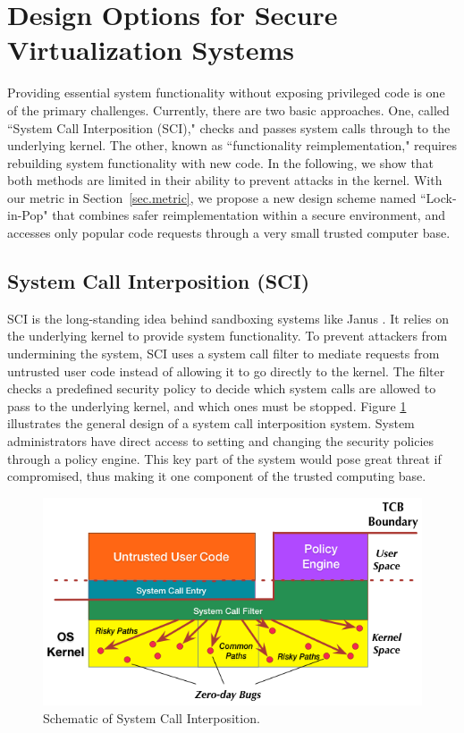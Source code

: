 \section{Design Options for Secure Virtualization Systems}
\label{sec.design}

Providing essential system functionality without exposing privileged code is one of the
primary challenges. 
Currently, there are two basic approaches.
One, called ``System Call Interposition (SCI)," checks and passes system calls
through to the underlying kernel. The other, known as ``functionality
reimplementation,"  
requires rebuilding system functionality with new code. In the
following, we show that both methods are limited in their ability to
prevent attacks in the kernel. 
With our metric in Section~\ref{sec.metric}, 
we propose a new design scheme named ``Lock-in-Pop" that combines safer reimplementation
within a secure environment, and accesses only popular code requests through a
very small trusted computer base. 


\subsection{System Call Interposition (SCI)}
SCI is the long-standing idea behind sandboxing systems like Janus
\cite{Janus0:96, Janus:99}. It relies on the underlying kernel
to provide system functionality. To prevent attackers from undermining the system,
SCI uses a system call filter to mediate requests
from untrusted user code instead of allowing it to go directly to the kernel.
The filter checks a predefined security policy to decide which system calls are
allowed to pass to the underlying kernel, and which ones must be stopped.
Figure \ref{fig:design_system_call_interposition} illustrates the general design
of a system call interposition system. System administrators have direct access to 
setting and changing the security policies through a policy engine. 
This key part of the system would pose great threat if compromised, thus making it 
one component of the trusted computing base. 

\begin{figure}%
\centering
\includegraphics[width=1.0\columnwidth]{diagram/Virtualization_Design_Model_03.png}
\caption{\small Schematic of System Call Interposition.}
\label{fig:design_system_call_interposition}
\end{figure}  

